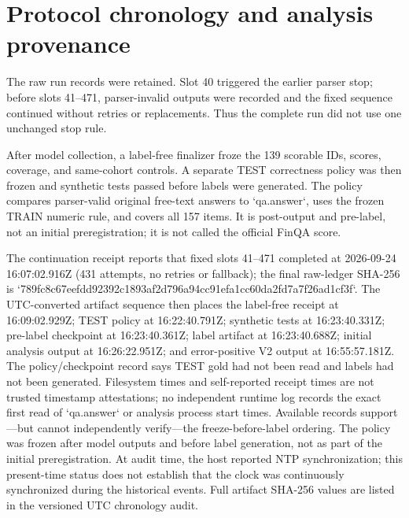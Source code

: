 \documentclass[11pt]{article}
\begin{document}
\section{Protocol chronology and analysis provenance}
The raw run records were retained. Slot 40 triggered the earlier parser stop; before slots 41--471, parser-invalid outputs were recorded and the fixed sequence continued without retries or replacements. Thus the complete run did not use one unchanged stop rule.

After model collection, a label-free finalizer froze the 139 scorable IDs, scores, coverage, and same-cohort controls. A separate TEST correctness policy was then frozen and synthetic tests passed before labels were generated. The policy compares parser-valid original free-text answers to `qa.answer`, uses the frozen TRAIN numeric rule, and covers all 157 items. It is post-output and pre-label, not an initial preregistration; it is not called the official FinQA score.

The continuation receipt reports that fixed slots 41--471 completed at 2026-09-24 16:07:02.916Z (431 attempts, no retries or fallback); the final raw-ledger SHA-256 is `789fc8c67eefdd92392c1893af2d796a94cc91efa1cc60da2fd7a7f26ad1cf3f`. The UTC-converted artifact sequence then places the label-free receipt at 16:09:02.929Z; TEST policy at 16:22:40.791Z; synthetic tests at 16:23:40.331Z; pre-label checkpoint at 16:23:40.361Z; label artifact at 16:23:40.688Z; initial analysis output at 16:26:22.951Z; and error-positive V2 output at 16:55:57.181Z. The policy/checkpoint record says TEST gold had not been read and labels had not been generated. Filesystem times and self-reported receipt times are not trusted timestamp attestations; no independent runtime log records the exact first read of `qa.answer` or analysis process start times. Available records support—but cannot independently verify—the freeze-before-label ordering. The policy was frozen after model outputs and before label generation, not as part of the initial preregistration. At audit time, the host reported NTP synchronization; this present-time status does not establish that the clock was continuously synchronized during the historical events. Full artifact SHA-256 values are listed in the versioned UTC chronology audit.
\end{document}
